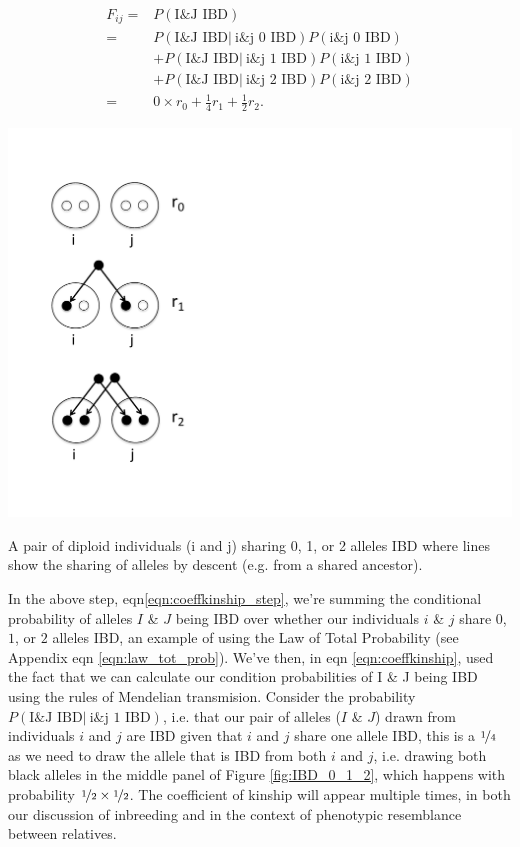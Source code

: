 {{\begin{align}
  F_{ij} = & P(\text{I\&J IBD} )\\
  =& P(\text{I\&J IBD} |~ \text{i\&j  0 IBD}) P(\text{i\&j  0 IBD})  \nonumber\\
  & + P(\text{I\&J IBD} |~ \text{i\&j  1 IBD})
    P(\text{i\&j  1 IBD})  \nonumber\\
  &+ P(\text{I\&J IBD} |~ \text{i\&j  2 IBD}) P(\text{i\&j  2 IBD}) \label{eqn:coeffkinship_step}\\
   =   &   0 \times r_0 + \frac{1}{4} r_1  + \frac{1}{2} r_2.
\label{eqn:coeffkinship}
\end{align}
\begin{marginfigure}[-1cm]
\begin{center}
\includegraphics[width= 0.75 \textwidth]{figures/sharing_relatives/IBD_0_1_2.pdf}
\end{center}
\caption{A pair of diploid individuals (i and j) sharing 0, 1, or 2 alleles IBD
  where lines show the sharing of alleles by descent (e.g. from a
  shared ancestor). } \label{fig:IBD_0_1_2}
\end{marginfigure}

In the above step, eqn\eqref{eqn:coeffkinship_step}, we're summing the
conditional probability of alleles $I$ \& $J$ being IBD over whether our individuals $i$ \& $j$ share $0$, $1$,
or $2$ alleles IBD, an example of using the Law of Total Probability (see Appendix
eqn \eqref{eqn:law_tot_prob}).  We've then, in eqn \ref{eqn:coeffkinship}, used the fact that we can
calculate our condition probabilities of  I \& J being IBD using the
rules of Mendelian transmision. Consider the probability $
P(\text{I\&J IBD} |~ \text{i\&j  1 IBD})$, i.e. that our
pair of alleles ($I$ \& $J$) drawn from individuals $i$ and $j$ are IBD given that
$i$ and $j$ share one allele IBD, this is a $\nicefrac{1}{4}$ as we need to
draw the allele that is IBD from both $i$ and $j$, i.e. drawing both black
alleles in the middle panel of Figure \ref{fig:IBD_0_1_2}, which
happens with probability $\nicefrac{1}{2} \times \nicefrac{1}{2} $. 
The coefficient of kinship will appear multiple times, in both our discussion of
inbreeding and in the context of phenotypic resemblance between relatives.\\

}}
